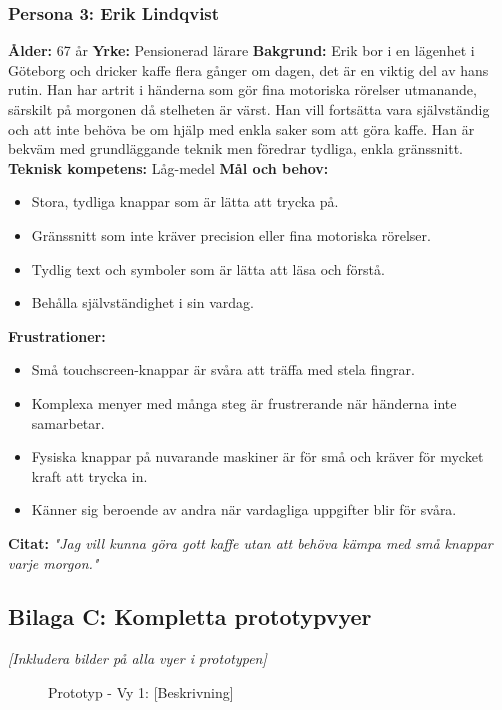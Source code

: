 \subsubsection{Persona 3: Erik Lindqvist}
\textbf{Ålder:} 67 år
\textbf{Yrke:} Pensionerad lärare
\textbf{Bakgrund:} Erik bor i en lägenhet i Göteborg och dricker kaffe flera gånger om dagen, det är en viktig del av hans rutin. Han har artrit i händerna som gör fina motoriska rörelser utmanande, särskilt på morgonen då stelheten är värst. Han vill fortsätta vara självständig och att inte behöva be om hjälp med enkla saker som att göra kaffe. Han är bekväm med grundläggande teknik men föredrar tydliga, enkla gränssnitt.
\textbf{Teknisk kompetens:} Låg-medel
\textbf{Mål och behov:}
\begin{itemize}
\item Stora, tydliga knappar som är lätta att trycka på.
\item Gränssnitt som inte kräver precision eller fina motoriska rörelser.
\item Tydlig text och symboler som är lätta att läsa och förstå.
\item Behålla självständighet i sin vardag.
\end{itemize}
\textbf{Frustrationer:}
\begin{itemize}
\item Små touchscreen-knappar är svåra att träffa med stela fingrar.
\item Komplexa menyer med många steg är frustrerande när händerna inte samarbetar.
\item Fysiska knappar på nuvarande maskiner är för små och kräver för mycket kraft att trycka in.
\item Känner sig beroende av andra när vardagliga uppgifter blir för svåra.
\end{itemize}
\textbf{Citat:} \textit{"Jag vill kunna göra gott kaffe utan att behöva kämpa med små knappar varje morgon."}


\subsection{Bilaga C: Kompletta prototypvyer}

\textit{[Inkludera bilder på alla vyer i prototypen]}

\begin{figure}[ht]
    \centering
    \caption{Prototyp - Vy 1: [Beskrivning]}
\end{figure}

